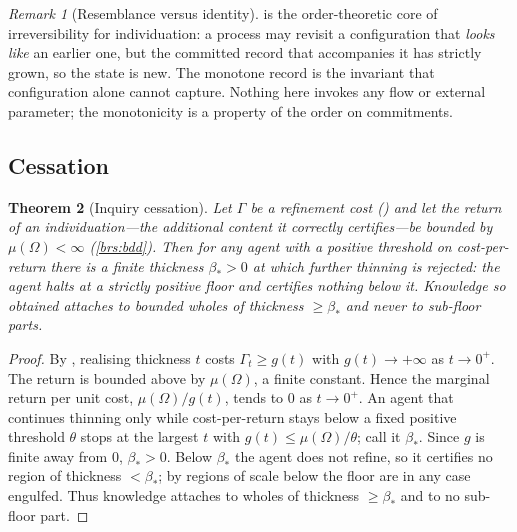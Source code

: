 \documentclass[11pt,twocolumn,a4paper]{article}
\theoremstyle{thmstyle}
\newtheorem{theorem}{Theorem}[section]
\theoremstyle{definition}
\theoremstyle{remark}
\newtheorem{remark}[theorem]{Remark}
\newcommand{\Space}{\Omega}
\newcommand{\thick}{\beta}
\begin{document}
\begin{remark}[Resemblance versus identity]
\label{rem:resemblance}
 is the order-theoretic core of irreversibility for
individuation: a process may revisit a configuration that \emph{looks like} an
earlier one, but the committed record that accompanies it has strictly grown, so
the state is new. The monotone record is the invariant that configuration alone
cannot capture. Nothing here invokes any flow or external parameter; the
monotonicity is a property of the order on commitments.
\end{remark}

\subsection{Cessation}

\begin{theorem}[Inquiry cessation]
\label{thm:cessation}
Let $\Gamma$ be a refinement cost \textup{(}\textup{)} and let the
return of an individuation---the additional content it correctly certifies---be
bounded by $\mu(\Space)<\infty$ \textup{(}\ref{brs:bdd}\textup{)}. Then for any
agent with a positive threshold on cost-per-return there is a finite thickness
$\thick_\ast>0$ at which further thinning is rejected: the agent halts at a
strictly positive floor and certifies nothing below it. Knowledge so obtained
attaches to bounded wholes of thickness $\ge\thick_\ast$ and never to sub-floor
parts.
\end{theorem}

\begin{proof}
By , realising thickness $t$ costs $\Gamma_t\ge g(t)$ with
$g(t)\to+\infty$ as $t\to0^+$. The return is bounded above by $\mu(\Space)$, a
finite constant. Hence the marginal return per unit cost,
$\mu(\Space)/g(t)$, tends to $0$ as $t\to0^+$. An agent that continues thinning
only while cost-per-return stays below a fixed positive threshold $\theta$ stops
at the largest $t$ with $g(t)\le\mu(\Space)/\theta$; call it $\thick_\ast$. Since
$g$ is finite away from $0$, $\thick_\ast>0$. Below $\thick_\ast$ the agent does
not refine, so it certifies no region of thickness $<\thick_\ast$; by
 regions of scale below the floor are in any case
engulfed. Thus knowledge attaches to wholes of thickness $\ge\thick_\ast$ and to
no sub-floor part.
\end{proof}
\end{document}
